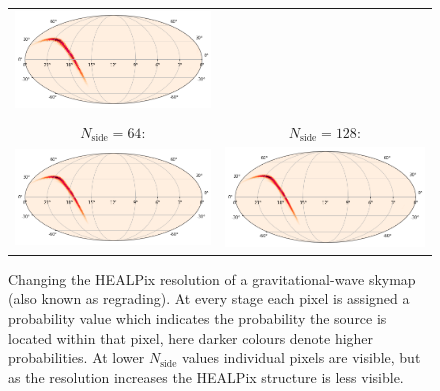 \begin{colsection}
\begin{colsection}
\begin{figure}[p]
\begin{center}
\begin{tabular}{cc}
            \includegraphics[width=0.45\linewidth]{images/regrade/32.png} \\
            \\
            $N_\text{side} = 64$: &
            $N_\text{side} = 128$: \\
            \includegraphics[width=0.45\linewidth]{images/regrade/64.png} &
            \includegraphics[width=0.45\linewidth]{images/regrade/128.png} \\
        \end{tabular}
    \end{center}
    \caption[Regrading a gravitational-wave skymap]{
        Changing the HEALPix resolution of a gravitational-wave skymap (also known as regrading). At every stage each pixel is assigned a probability value which indicates the probability the source is located within that pixel, here darker colours denote higher probabilities. At lower $N_\text{side}$ values individual pixels are visible, but as the resolution increases the HEALPix structure is less visible.
    }\label{fig:skymap_regrade}
\end{figure}


\end{colsection}
\end{colsection}
